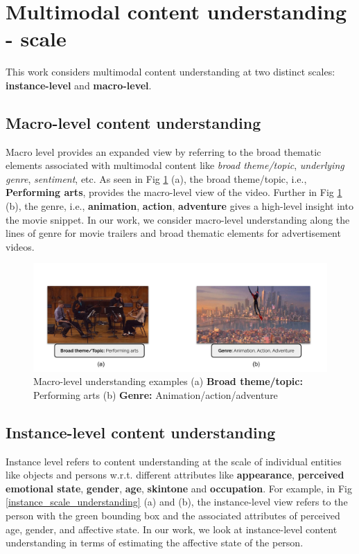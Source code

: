 \section{Multimodal content understanding - scale}

This work considers multimodal content understanding at two distinct scales: \textbf{instance-level} and \textbf{macro-level}. 

\subsection{Macro-level content understanding}
Macro level provides an expanded view by referring to the broad thematic elements associated with multimodal content like \textit{broad theme/topic}, \textit{underlying genre}, \textit{sentiment}, etc. As seen in Fig \ref{macro_scale_understanding} (a), the broad theme/topic, i.e., \textbf{Performing arts}, provides the macro-level view of the video. Further in Fig  \ref{macro_scale_understanding} (b), the genre, i.e., \textbf{animation}, \textbf{action}, \textbf{adventure} gives a high-level insight into the movie snippet. In our work, we consider macro-level understanding along the lines of genre for movie trailers and broad thematic elements for advertisement videos. 
\begin{figure}
 \centering
    \includegraphics[width=\textwidth]{figures/macro_scale_understanding.pdf}
    \caption{Macro-level understanding examples (a) \textbf{Broad theme/topic:} Performing arts (b) \textbf{Genre:} Animation/action/adventure}
    \label{macro_scale_understanding}
\end{figure}

\subsection{Instance-level content understanding}

Instance level refers to content understanding at the scale of individual entities like objects and persons w.r.t. different attributes like \textbf{appearance}, \textbf{perceived emotional state}, \textbf{gender}, \textbf{age}, \textbf{skintone} and \textbf{occupation}. For example, in Fig \ref{instance_scale_understanding} (a) and (b), the instance-level view refers to the person with the green bounding box and the associated attributes of perceived age, gender, and affective state. In our work, we look at instance-level content understanding in terms of estimating the affective state of the person.

